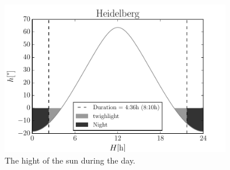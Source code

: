 \documentclass[11pt,a4paper,twoside]{article}
\begin{document}
\begin{figure}
\centering
\includegraphics[width=10cm]{pic/night}
\caption{The hight of the sun during the day.}
\label{fig:h}
\end{figure}
\end{document}
